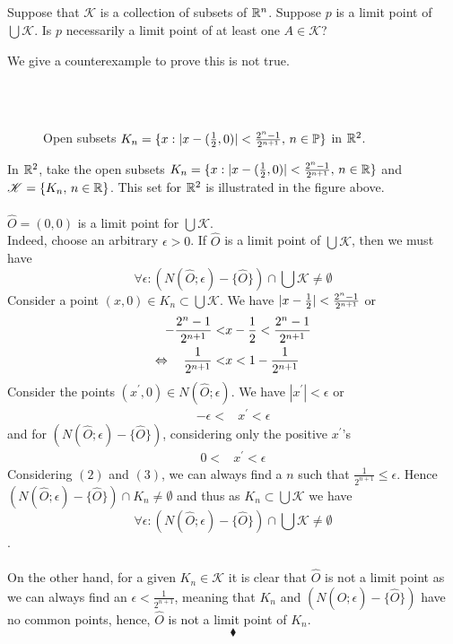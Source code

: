 \subsection{}
\begin{tcolorbox}

Suppose that $\mathscr{K}$ is a collection of subsets of $\mathbb{R}^n$. Suppose $p$ is a limit point of $\bigcup \mathscr{K}$. Is $p$ necessarily a limit point of at least one $A\in \mathscr{K}$?
\end{tcolorbox}
We give a counterexample to prove this is not true.\\\
\begin{figure}[H]%
    \centering
\\
\caption{Open subsets $K_n=\{x:|x-(\frac{1}{2},0)|< \frac{2^n-1  }{2^{n+1}},\, n\in\mathbb{P}\}$ in $\mathbb{R}^2$.}
\label{fig:fig_p8a}
\end{figure}
In $\mathbb{R}^2$, take the open subsets $K_n=\{x:|x-(\frac{1}{2},0)|<\frac{2^n-1}{2^{n+1}},\, n\in \mathbb{R}\}$ and $\mathscr{K}=\{K_n,\,n\in \mathbb{R} \}$. This set for $\mathbb{R}^2$ is illustrated in the figure above.\\\\
$\hat{O}=(0,0)$ is a limit point for $\bigcup \mathscr{K}$. \\
Indeed, choose an arbitrary $\epsilon >0$. If $\hat{O}$ is a limit point of $\bigcup \mathscr{K}$, then we must have 
$$\forall \epsilon :\left(N(\hat{O};\epsilon)-\{\hat{O}\}\right)\cap \bigcup \mathscr{K}\neq \emptyset$$ Consider a point $(x,0)\in K_n\subset \bigcup \mathscr{K} $. We have $|x-\frac{1}{2}|<\frac{2^n-1}{2^{n+1}}$ or 
\begin{align}
-\frac{2^n-1}{2^{n+1}}<&x-\frac{1}{2}<\frac{2^n-1}{2^{n+1}}\\
\Leftrightarrow\quad  \frac{1}{2^{n+1}}<&x<1-\frac{1}{2^{n+1}}
\end{align}
Consider the points $(x^{'},0)\in N(\hat{O};\epsilon)$. We have $|x^{'}|<\epsilon$ or 
\begin{align*}
-\epsilon<&x^{'}<\epsilon
\end{align*}
and for $\left(N(\hat{O};\epsilon)-\{\hat{O}\}\right)$, considering only the positive $x^{'}$'s
\begin{align}
0<&x^{'}<\epsilon
\end{align}
Considering $(2)$ and $(3)$, we can always find a $n$ such that $\frac{1}{2^{n+1}}\leq\epsilon$. Hence  $\left(N(\hat{O};\epsilon)-\{\hat{O}\}\right)\cap K_n\neq \emptyset$ and thus as $K_n\subset  \bigcup \mathscr{K}$ we have
$$\forall \epsilon :\left(N(\hat{O};\epsilon)-\{\hat{O}\}\right)\cap \bigcup \mathscr{K}\neq \emptyset$$.\\\\
On the other hand, for a given $K_n\in \mathscr{K}$ it is clear that $\hat{O}$ is not a limit point as we can always find an $\epsilon < \frac{1}{2^{n+1}}$, meaning that $K_n$ and $\left(N(\hat{O};\epsilon)-\{\hat{O}\}\right)$ have no common points, hence, $\hat{O}$ is not a limit point of $K_n$.
$$\blacklozenge$$\\


